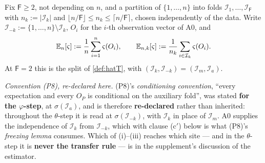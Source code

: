 \begin{definition}\label{def:crossfit}
Fix $\mathsf F\ge2$, not depending on $n$, and a partition of $\{1,\dots,n\}$ into folds
$\mathcal I_1,\dots,\mathcal I_{\mathsf F}$ with $n_k:=|\mathcal I_k|$ and
$\lfloor n/\mathsf F\rfloor\le n_k\le\lceil n/\mathsf F\rceil$, chosen independently of the data. Write
$\mathcal I_{-k}:=\{1,\dots,n\}\setminus\mathcal I_k$, $O_i$ for the $i$-th observation vector of A0, and
\[
\mathbb{E}_n[\varsigma]:=\frac1n\sum_{i=1}^{n}\varsigma(O_i),
\qquad
\mathbb{E}_{n,k}[\varsigma]:=\frac1{n_k}\sum_{i\in\mathcal I_k}\varsigma(O_i) .
\]
At $\mathsf F=2$ this is the split of \cref{def:hatT}, with $(\mathcal I_k,\mathcal I_{-k})=(\mathcal I_m,\mathcal I_a)$.

\emph{Convention \textup{(P8)}, re-declared here.} \textup{(P8)}'s \emph{conditioning convention},
``every expectation and every $O_P$ is conditional on the auxiliary fold'', was stated \textbf{for the
$\varphi$-step}, at $\sigma(\mathcal I_a)$, and is therefore \textbf{re-declared} rather than inherited:
throughout the $\theta$-step it is read at $\sigma(\mathcal I_{-k})$, with $\mathcal I_k$ in place of
$\mathcal I_m$. A0 supplies the independence of $\mathcal I_k$ from $\mathcal I_{-k}$, which with clause
\textup{(c$'$)} below is what \textup{(P8)}'s \emph{freezing lemma} consumes. Which of
(i)--(iii) reaches which site --- and in the $\theta$-step it is \textbf{never the
transfer rule} --- is in the supplement's discussion of the estimator.


\end{definition}
